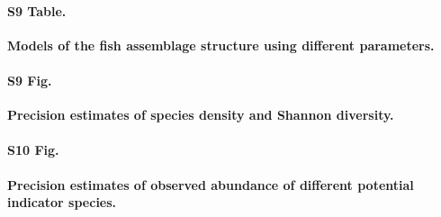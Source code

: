 \documentclass[10pt,letterpaper]{article}
\begin{document}
\paragraph*{S9 Table.}
\label{PERMANOVA_Video_analyst}
{\bf Models of the fish assemblage structure using different parameters.}


\paragraph*{S9 Fig.}
\label{fig:precision_SR_turbidity}
{\bf Precision estimates of species density and Shannon diversity.}

\paragraph*{S10 Fig.}
\label{fig:precision_ind_specsN}
{\bf Precision estimates of observed abundance of different potential indicator species.}


%
%
% 
%
\end{document}
